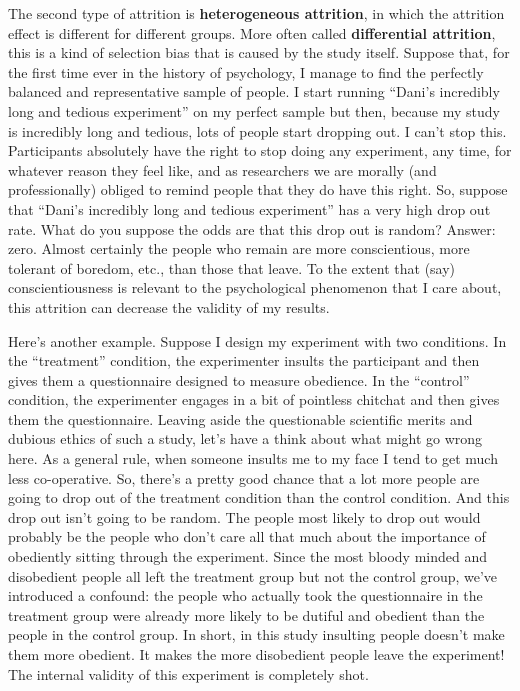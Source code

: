 \documentclass[
  letterpaper,
]{book}
\begin{document}
The second type of attrition is \textbf{heterogeneous attrition}, in
which the attrition effect is different for different groups. More often
called \textbf{differential attrition}, this is a kind of selection bias
that is caused by the study itself. Suppose that, for the first time
ever in the history of psychology, I manage to find the perfectly
balanced and representative sample of people. I start running ``Dani's
incredibly long and tedious experiment'' on my perfect sample but then,
because my study is incredibly long and tedious, lots of people start
dropping out. I can't stop this. Participants absolutely have the right
to stop doing any experiment, any time, for whatever reason they feel
like, and as researchers we are morally (and professionally) obliged to
remind people that they do have this right. So, suppose that ``Dani's
incredibly long and tedious experiment'' has a very high drop out rate.
What do you suppose the odds are that this drop out is random? Answer:
zero. Almost certainly the people who remain are more conscientious,
more tolerant of boredom, etc., than those that leave. To the extent
that (say) conscientiousness is relevant to the psychological phenomenon
that I care about, this attrition can decrease the validity of my
results.

Here's another example. Suppose I design my experiment with two
conditions. In the ``treatment'' condition, the experimenter insults the
participant and then gives them a questionnaire designed to measure
obedience. In the ``control'' condition, the experimenter engages in a
bit of pointless chitchat and then gives them the questionnaire. Leaving
aside the questionable scientific merits and dubious ethics of such a
study, let's have a think about what might go wrong here. As a general
rule, when someone insults me to my face I tend to get much less
co-operative. So, there's a pretty good chance that a lot more people
are going to drop out of the treatment condition than the control
condition. And this drop out isn't going to be random. The people most
likely to drop out would probably be the people who don't care all that
much about the importance of obediently sitting through the experiment.
Since the most bloody minded and disobedient people all left the
treatment group but not the control group, we've introduced a confound:
the people who actually took the questionnaire in the treatment group
were already more likely to be dutiful and obedient than the people in
the control group. In short, in this study insulting people doesn't make
them more obedient. It makes the more disobedient people leave the
experiment! The internal validity of this experiment is completely shot.
\end{document}
